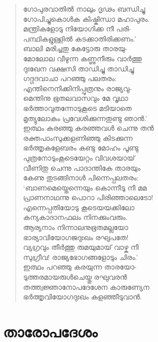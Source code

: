 \begin{verse}
ഗോപുരവാതില്‍ നാലും ദൃഢം ബന്ധിച്ചു\\
ഗോപിച്ചുകൊള്‍ക കിഷ്കിന്ധാ മഹാപുരം.\\
മന്ത്രികളോടു നിയോഗിക്ക നീ പരി-\\
പന്ഥികളുള്ളില്‍ കടക്കാതിരിക്കണം.’\\
ബാലി മരിച്ചതു കേട്ടോരു താരയു-\\
മോലോല വീഴുന്ന കണ്ണുനീരും വാര്‍ത്തു\\
ദുഃഖേന വക്ഷസി താഡിച്ചു താഡിച്ചു\\
ഗദ്ഗദവാചാ പറഞ്ഞു പലതരം:\\
എന്തിനെനിക്കിനിപ്പുത്രനും രാജ്യവു-\\
മെന്തിനു ഭൂതലവാസവും മേ വൃഥാ\\
ഭര്‍ത്താവുതന്നോടുകൂടെ മടിയാതെ\\
മൃത്യുലോകം പ്രവേശിക്കുന്നതുണ്ടു ഞാന്‍.’\\
ഇത്ഥം കരഞ്ഞു കരഞ്ഞവള്‍ ചെന്നു തന്‍\\
രക്തപാംസുക്കളണിഞ്ഞു കിടക്കുന്ന\\
ഭര്‍ത്തൃകളേബരം കണ്ടു മോഹം പൂണ്ടു\\
പുത്രനോടുംകൂടെയേറ്റം വിവശയായ്\\
വീണിതു ചെന്നു പാദാന്തികേ താരയും\\
കേണു തുടങ്ങിനാള്‍ പിന്നെപ്പലതരം:\\
‘ബാണമെയ്തെന്നെയും കൊന്നീടു നീ മമ\\
പ്രാണനാഥന്നു പൊറാ പിരിഞ്ഞാലെടോ!\\
എന്നെപ്പതിയോടു കൂടെയയക്കിലോ\\
കന്യകാദാനഫലം നിനക്കുംവരും.\\
ആര്യനാം നിന്നാലനുഭൂതമല്ലയോ\\
ഭാര്യാവിയോഗജദുഃഖം രഘുപതേ!\\
വ്യഗ്രവും തീര്‍ത്തു രുമയുമായ് വാഴ്ക നീ\\
സുഗ്രീവ! രാജ്യഭോഗങ്ങളോടും ചിരം.’\\
ഇത്ഥം പറഞ്ഞു കരയുന്ന താരയോ-\\
ടുത്തരമായരുള്‍ചെയ്തു രഘുവരന്‍\\
തത്ത്വജ്ഞാനോപദേശേന കാരുണ്യേന\\
ഭര്‍ത്തൃവിയോഗദുഃഖം കളഞ്ഞീടുവാന്‍.
\end{verse}


\section{താരോപദേശം}

